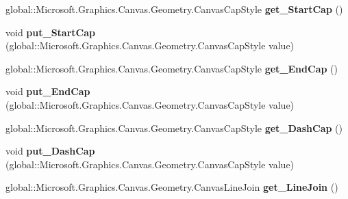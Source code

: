 \begin{DoxyCompactItemize}
global\+::\+Microsoft.\+Graphics.\+Canvas.\+Geometry.\+Canvas\+Cap\+Style {\bfseries get\+\_\+\+Start\+Cap} ()
\item 
\mbox{\label{interface_microsoft_1_1_graphics_1_1_canvas_1_1_geometry_1_1_i_canvas_stroke_style_a2fdd3aee781a3fb799081a2ec567b732}} 
void {\bfseries put\+\_\+\+Start\+Cap} (global\+::\+Microsoft.\+Graphics.\+Canvas.\+Geometry.\+Canvas\+Cap\+Style value)
\item 
\mbox{\label{interface_microsoft_1_1_graphics_1_1_canvas_1_1_geometry_1_1_i_canvas_stroke_style_aab45339696dfcadb0ae0eb8e89bb68e4}} 
global\+::\+Microsoft.\+Graphics.\+Canvas.\+Geometry.\+Canvas\+Cap\+Style {\bfseries get\+\_\+\+End\+Cap} ()
\item 
\mbox{\label{interface_microsoft_1_1_graphics_1_1_canvas_1_1_geometry_1_1_i_canvas_stroke_style_aef264fbe0fcf18df425b8904ea4dca31}} 
void {\bfseries put\+\_\+\+End\+Cap} (global\+::\+Microsoft.\+Graphics.\+Canvas.\+Geometry.\+Canvas\+Cap\+Style value)
\item 
\mbox{\label{interface_microsoft_1_1_graphics_1_1_canvas_1_1_geometry_1_1_i_canvas_stroke_style_a6460321748d903188a3fd0c96b9309df}} 
global\+::\+Microsoft.\+Graphics.\+Canvas.\+Geometry.\+Canvas\+Cap\+Style {\bfseries get\+\_\+\+Dash\+Cap} ()
\item 
\mbox{\label{interface_microsoft_1_1_graphics_1_1_canvas_1_1_geometry_1_1_i_canvas_stroke_style_a2c6fb2a6009bda6b6bf0b8882ec5b651}} 
void {\bfseries put\+\_\+\+Dash\+Cap} (global\+::\+Microsoft.\+Graphics.\+Canvas.\+Geometry.\+Canvas\+Cap\+Style value)
\item 
\mbox{\label{interface_microsoft_1_1_graphics_1_1_canvas_1_1_geometry_1_1_i_canvas_stroke_style_aa99219b6d76643e93de91296b3261eb8}} 
global\+::\+Microsoft.\+Graphics.\+Canvas.\+Geometry.\+Canvas\+Line\+Join {\bfseries get\+\_\+\+Line\+Join} ()

\end{DoxyCompactItemize}
